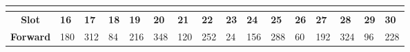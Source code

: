 \documentclass{reportClass}
\begin{document}
\begin{table}[h!]
\begin{tabular}{|clllllllllllllll|}
\textbf{}                              &                                                          &                                                          &                                                          &                                                          &                                                          &                                                          &                                                          &                                                          &                                                          &                                                          &                                                          &                                                          &                                                          &                                                          &                                     \\ \hline
\multicolumn{1}{|c|}{\textbf{Slot}}    & \multicolumn{1}{l|}{\textbf{16}}                         & \multicolumn{1}{l|}{\textbf{17}}                         & \multicolumn{1}{l|}{\textbf{18}}                         & \multicolumn{1}{l|}{\textbf{19}}                         & \multicolumn{1}{l|}{\textbf{20}}                         & \multicolumn{1}{l|}{\textbf{21}}                         & \multicolumn{1}{l|}{\textbf{22}}                         & \multicolumn{1}{l|}{\textbf{23}}                         & \multicolumn{1}{l|}{\textbf{24}}                         & \multicolumn{1}{l|}{\textbf{25}}                         & \multicolumn{1}{l|}{\textbf{26}}                         & \multicolumn{1}{l|}{\textbf{27}}                         & \multicolumn{1}{l|}{\textbf{28}}                         & \multicolumn{1}{l|}{\textbf{29}}                         & \textbf{30}                         \\ \hline
\multicolumn{1}{|c|}{\textbf{Forward}} & \multicolumn{1}{l|}{180}                                 & \multicolumn{1}{l|}{312}                                 & \multicolumn{1}{l|}{84}                                  & \multicolumn{1}{l|}{216}                                 & \multicolumn{1}{l|}{348}                                 & \multicolumn{1}{l|}{120}                                 & \multicolumn{1}{l|}{252}                                 & \multicolumn{1}{l|}{24}                                  & \multicolumn{1}{l|}{156}                                 & \multicolumn{1}{l|}{288}                                 & \multicolumn{1}{l|}{60}                                  & \multicolumn{1}{l|}{192}                                 & \multicolumn{1}{l|}{324}                                 & \multicolumn{1}{l|}{96}                                  & 228                                 \\ \hline

\end{tabular}
\end{table}
\end{document}

